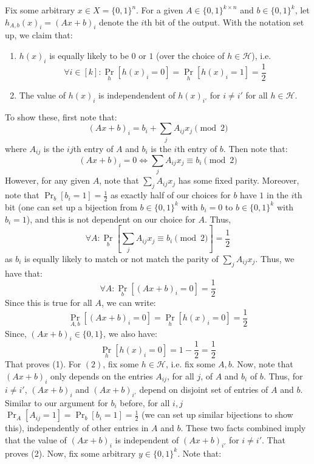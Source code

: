 \documentclass[12pt]{article}
\begin{document}
\begin{solution}
    Fix some arbitrary $x \in X = \{0, 1\}^n$. For a given $A \in \{0,1\}^{k \times n}$ and $b \in \{0,1\}^k$, let $h_{A,b}(x)_i = (Ax+b)_i$ denote the $i$th bit of the output. With the notation set up, we claim that:
    \begin{enumerate}
        \item  $h(x)_i$ is equally likely to be $0$ or $1$ (over the choice of $h \in \mathcal{H}$), i.e.
        \[\forall i \in [k] : \Pr_h[h(x)_i = 0] = \Pr_h[h(x)_i = 1] = \frac{1}{2} \]
        \item The value of $h(x)_i$ is independendent of $h(x)_{i'}$ for $i \neq i'$ for all $h \in \mathcal{H}$. 
    \end{enumerate}
    To show these, first note that: 
    \[ (Ax+b)_i = b_i + \sum_j A_{ij}x_j \pmod{2} \]
    where $A_{ij}$ is the $ij$th entry of $A$ and $b_i$ is the $i$th entry of $b$. \bbni
    Then note that: 
    \[ (Ax+b)_i = 0 \iff \sum_{j}A_{ij}x_j \equiv b_i \pmod{2} \]
    However, for any given $A$, note that $\sum_{j}A_{ij}x_j$ has some fixed parity. Moreover, note that $\Pr_{b}[b_i = 1] = \frac{1}{2}$ as exactly half of our choices for $b$ have $1$ in the $i$th bit (one can set up a bijection from $b \in \{0,1\}^k$ with $b_i = 0$ to $b \in \{0,1\}^k$ with $b_i = 1$), and this is not dependent on our choice for $A$. Thus, 
    \[ \forall A : \Pr_{b}\left[\sum_{j}A_{ij}x_j \equiv b_i \pmod{2}\right] = \frac{1}{2}\] 
    as $b_i$ is equally likely to match or not match the parity of $\sum_{j}A_{ij}x_j$. Thus, we have that: 
    \[ \forall A : \Pr_b[(Ax+b)_i = 0] = \frac{1}{2} \]
    Since this is true for all $A$, we can write: 
    \[ \Pr_{A,b}[(Ax+b)_i = 0] = \Pr_{h}[h(x)_i = 0] = \frac{1}{2} \]
    Since, $(Ax+b)_i \in \{0,1\}$, we also have: 
    \[ \Pr_{h}[h(x)_i = 0] = 1- \frac{1}{2} = \frac{1}{2}\]
    That proves (1). For $(2)$, fix some $h \in \mathcal{H}$, i.e. fix some $A, b$. Now, note that $(Ax+b)_i$ only depends on the entries $A_{ij}$, for all $j$, of $A$ and $b_i$ of $b$. Thus, for $i \neq i'$, $(Ax+b)_i$ and $(Ax+b)_{i'}$ depend on disjoint set of entries of $A$ and $b$. Similar to our argument for $b_i$ before, for all $i, j$ $\Pr_A[A_{ij} = 1] = \Pr_b[b_i = 1] = \frac{1}{2}$ (we can set up similar bijections to show this), independently of other entries in $A$ and $b$. These two facts combined imply that the value of $(Ax+b)_i$ is independent of $(Ax+b)_{i'}$ for $i \neq i'$. That proves (2). \bbni  
    Now, fix some arbitrary $y \in \{0,1\}^k$. Note that: 
    \begin{align*}

\end{align*}
\end{solution}
\end{document}
